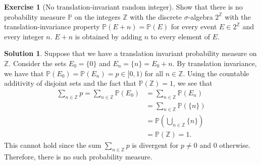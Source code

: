 \documentclass[12pt]{article}
\newcommand{\bbZ}{\mathbb{Z}}
\newcommand{\Prob}{\mathbb{P}}
\theoremstyle{definition}
\newtheorem{exer}{Exercise}
\newtheorem{sol}{Solution}
\theoremstyle{remark}
\begin{document}
\begin{exer}[No translation-invariant random integer]
Show that there is no probability measure $\Prob$ on the integers $\mathbb{Z}$ with the discrete
$\sigma$-algebra $2^{\mathbb{Z}}$ with the translation-invariance property $\Prob(E + n) = \Prob(E)$ for every event $E \in 2^{\mathbb{Z}}$ and every integer $n$. $E+n$ is obtained by adding $n$ to every element of $E$.
\end{exer}
\begin{sol}
    Suppose that we have a translation invariant probability measure on $\bbZ$. Consider the sets $E_0 = \{ 0\}$ and $E_n =\{ n\} = E_0 + n$. By translation invariance, we have that $\Prob(E_0) = \Prob(E_n) = p \in [0,1)$ for all $n\in\bbZ$. Using the countable additivity of disjoint sets and the fact that $\Prob(\bbZ)=1$, we see that
    \begin{align}
        \sum_{n\in\bbZ} p = \sum_{n\in\bbZ} \Prob(E_0) &= \sum_{n\in\bbZ} \Prob(E_n)\\
                                                       &= \sum_{n\in\bbZ} \Prob(\{ n \})\\
                                                       &= \Prob \left( \bigcup_{n\in\bbZ} \{n \}\right)\\
                                                       &= \Prob(\bbZ) = 1.
    \end{align}
    This cannot hold since the sum $\sum_{n\in\bbZ} p$ is divergent for $p\neq 0$ and 0 otherwise. Therefore, there is no such probability measure.
\end{sol}
\end{document}
